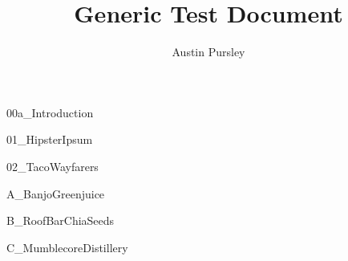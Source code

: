 \documentclass{myArticleClass}
\title{Generic Test Document}
\author{Austin Pursley}
\begin{document}
	\maketitle
	\clearpage
	{00a_Introduction}

	\clearpage
	\tableofcontents
    \newpage
    \begin{center}
    \lhead{}
    \listoftables
    \newpage
    \listoffigures
    \end{center}
    \clearpage
	
	\glsresetall %

	\clearpage
	{01_HipsterIpsum}

	\clearpage
	{02_TacoWayfarers}

	\clearpage
	\printbibliography[heading=bibnumbered,title={References}]
    

	\clearpage
	\renewcommand{\appendixpagename}{\center{\Large{Appendices}}}
	\appendix
	\begin{appendices}
	\glsresetall %

	\clearpage
	{A_BanjoGreenjuice}

	\clearpage
	{B_RoofBarChiaSeeds}

	\clearpage
	{C_MumblecoreDistillery}

	\clearpage
	\printglossary[type=main,style=list]
	\printglossary[type=abbreviations, title={Acronyms}]
	\end{appendices}

	
\end{document}
